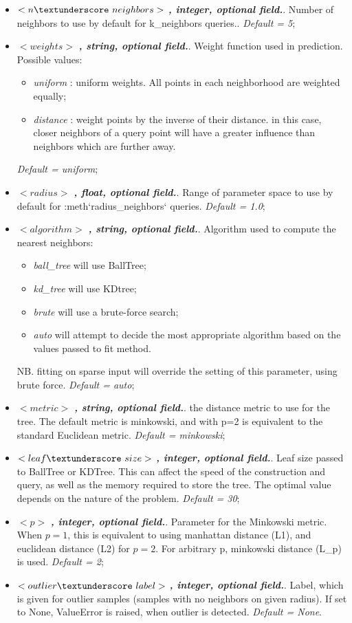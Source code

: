 \begin{itemize}
\item $<n\textunderscore~neighbors>$ \textbf{\textit{, integer, optional field.}}.  Number of neighbors to use by default for k\_neighbors queries.. \textit{Default = 5};
\item $<weights>$ \textbf{\textit{, string, optional field.}}. Weight function used in prediction. Possible values:
\begin{itemize}
\item \textit{uniform} : uniform weights. All points in each neighborhood are weighted equally;
\item \textit{distance} : weight points by the inverse of their distance. in this case, closer neighbors of a query point will have a greater influence than neighbors which are further away.
\end{itemize}
\textit{Default = uniform};
\item $<radius>$ \textbf{\textit{, float, optional field.}}.  Range of parameter space to use by default for :meth`radius\_neighbors` queries. \textit{Default = 1.0};
\item $<algorithm>$ \textbf{\textit{, string, optional field.}}.  Algorithm used to compute the nearest neighbors:
\begin{itemize}
\item \textit{ball\_tree} will use BallTree;
\item \textit{kd\_tree} will use KDtree;
\item \textit{brute} will use a brute-force search;
\item \textit{auto} will attempt to decide the most appropriate algorithm based on the values passed to fit method.
\end{itemize}
NB. fitting on sparse input will override the setting of this parameter, using brute force. \textit{Default = auto};
\item $<metric>$ \textbf{\textit{, string, optional field.}}.  the distance metric to use for the tree. The default metric is minkowski, and with p=2 is equivalent to the standard Euclidean metric. \textit{Default = minkowski};
\item $<leaf\textunderscore~size>$ \textbf{\textit{, integer, optional field.}}.  Leaf size passed to BallTree or KDTree. This can affect the speed of the construction and query, as well as the memory required to store the tree. The optimal value depends on the nature of the problem. \textit{Default = 30};
\item $<p>$ \textbf{\textit{, integer, optional field.}}.  Parameter for the Minkowski metric. When $p = 1$, this is equivalent to using manhattan distance (L1), and euclidean distance (L2) for $p = 2$. For arbitrary p, minkowski distance (L\_p) is used. \textit{Default = 2};
\item $<outlier\textunderscore~label>$ \textbf{\textit{, integer, optional field.}}.  Label, which is given for outlier samples (samples with no neighbors on given radius). If set to None, ValueError is raised, when outlier is detected. \textit{Default = None}.
\end{itemize}
